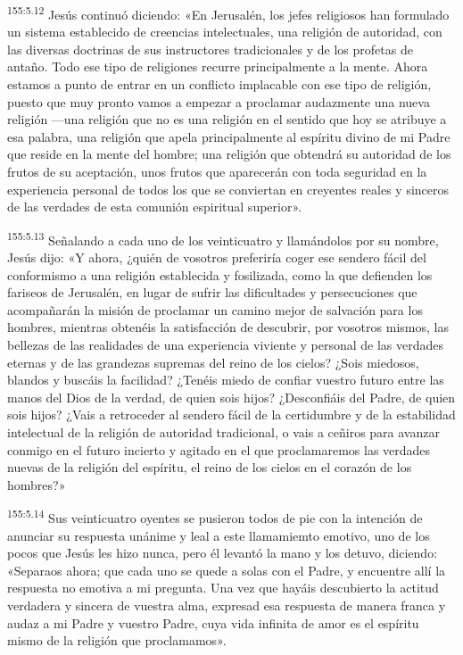 \par
\textsuperscript{155:5.12} Jesús continuó diciendo: «En Jerusalén, los jefes religiosos han formulado un sistema establecido de creencias intelectuales, una religión de autoridad, con las diversas doctrinas de sus instructores tradicionales y de los profetas de antaño. Todo ese tipo de religiones recurre principalmente a la mente. Ahora estamos a punto de entrar en un conflicto implacable con ese tipo de religión, puesto que muy pronto vamos a empezar a proclamar audazmente una nueva religión ---una religión que no es una religión en el sentido que hoy se atribuye a esa palabra, una religión que apela principalmente al espíritu divino de mi Padre que reside en la mente del hombre; una religión que obtendrá su autoridad de los frutos de su aceptación, unos frutos que aparecerán con toda seguridad en la experiencia personal de todos los que se conviertan en creyentes reales y sinceros de las verdades de esta comunión espiritual superior».

\par
\textsuperscript{155:5.13} Señalando a cada uno de los veinticuatro y llamándolos por su nombre, Jesús dijo: «Y ahora, ¿quién de vosotros preferiría coger ese sendero fácil del conformismo a una religión establecida y fosilizada, como la que defienden los fariseos de Jerusalén, en lugar de sufrir las dificultades y persecuciones que acompañarán la misión de proclamar un camino mejor de salvación para los hombres, mientras obtenéis la satisfacción de descubrir, por vosotros mismos, las bellezas de las realidades de una experiencia viviente y personal de las verdades eternas y de las grandezas supremas del reino de los cielos? ¿Sois miedosos, blandos y buscáis la facilidad? ¿Tenéis miedo de confiar vuestro futuro entre las manos del Dios de la verdad, de quien sois hijos? ¿Desconfiáis del Padre, de quien sois hijos? ¿Vais a retroceder al sendero fácil de la certidumbre y de la estabilidad intelectual de la religión de autoridad tradicional, o vais a ceñiros para avanzar conmigo en el futuro incierto y agitado en el que proclamaremos las verdades nuevas de la religión del espíritu, el reino de los cielos en el corazón de los hombres?»

\par
\textsuperscript{155:5.14} Sus veinticuatro oyentes se pusieron todos de pie con la intención de anunciar su respuesta unánime y leal a este llamamiemto emotivo, uno de los pocos que Jesús les hizo nunca, pero él levantó la mano y los detuvo, diciendo: «Separaos ahora; que cada uno se quede a solas con el Padre, y encuentre allí la respuesta no emotiva a mi pregunta. Una vez que hayáis descubierto la actitud verdadera y sincera de vuestra alma, expresad esa respuesta de manera franca y audaz a mi Padre y vuestro Padre, cuya vida infinita de amor es el espíritu mismo de la religión que proclamamos».

